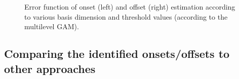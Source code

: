 \documentclass[
  doc,
  floatsintext,
  longtable,
  a4paper,
  nolmodern,
  notxfonts,
  notimes,
  colorlinks=true,linkcolor=blue,citecolor=blue,urlcolor=blue]{apa7}
\begin{document}
\begin{figure}[!htb]

\caption{\label{fig-onset-error}Error function of onset (left) and
offset (right) estimation according to various basis dimension and
threshold values (according to the multilevel GAM).}


\end{figure}%

\newpage

\subsection{Comparing the identified onsets/offsets to other
approaches}\label{comparing-the-identified-onsetsoffsets-to-other-approaches}
\end{document}
